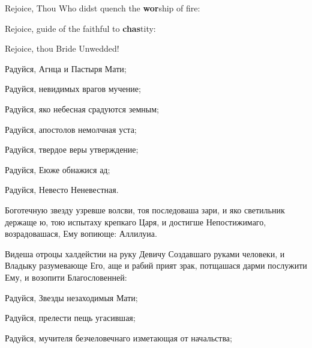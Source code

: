 
Rejoice, Thou Who didst quench the \textbf{wor}ship of fire:


Rejoice, guide of the faithful to \textbf{chas}tity:


Rejoice, thou Bride Unwedded!

\pagebreak

\KhorRaduisya Радуйся, Агнца и Пастыря Мати;


Радуйся, невидимых врагов мучение;


Радуйся, яко небесная срадуются земным;


Радуйся, апостолов немолчная уста;


Радуйся, твердое веры утверждение;


Радуйся, Еюже обнажися ад;


Радуйся, Невесто Неневестная.


\Ierei Боготечную звезду узревше волсви, тоя последоваша зари, и яко светильник держаще ю, тою испытаху крепкаго Царя, и достигше Непостижимаго, возрадовашася, Ему вопиюще: Аллилуиа.


\Ierei Видеша отроцы халдейстии на руку Девичу Создавшаго руками человеки, и Владыку разумевающе Его, аще и рабий прият зрак, потщашася дарми послужити Ему, и возопити Благословенней:

\KhorRaduisya Радуйся, Звезды незаходимыя Мати;


Радуйся, прелести пещь угасившая;


Радуйся, мучителя безчеловечнаго изметающая от начальства;

